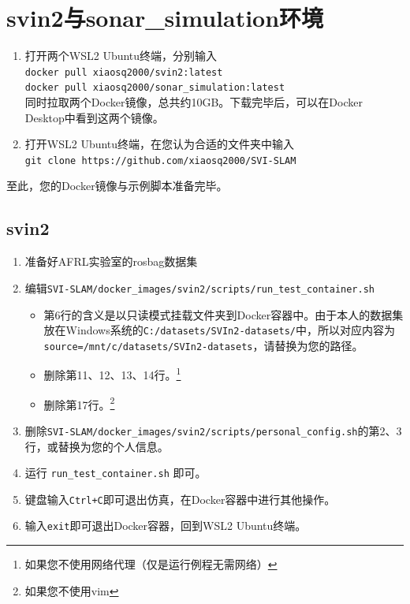 \documentclass[UTF8,zhmap=true,fontset=none,zihao=-4,heading=false,scheme=chinese]{ctexart}
\begin{document}
\section{svin2与sonar\_simulation环境}
\begin{enumerate}
    \item 打开两个WSL2 Ubuntu终端，分别输入 \\
    \verb|docker pull xiaosq2000/svin2:latest| \\ 
    \verb|docker pull xiaosq2000/sonar_simulation:latest| \\ 
    同时拉取两个Docker镜像，总共约10GB。下载完毕后，可以在Docker Desktop中看到这两个镜像。
    \item 打开WSL2 Ubuntu终端，在您认为合适的文件夹中输入 \\
    \verb|git clone https://github.com/xiaosq2000/SVI-SLAM| \\ 
\end{enumerate}
\par 至此，您的Docker镜像与示例脚本准备完毕。
\subsection{svin2}
\begin{enumerate}
    \item 准备好AFRL实验室的rosbag数据集
    \item 编辑\verb|SVI-SLAM/docker_images/svin2/scripts/run_test_container.sh|
    \begin{itemize}
        \item 第6行的含义是以只读模式挂载文件夹到Docker容器中。由于本人的数据集放在Windows系统的\verb|C:/datasets/SVIn2-datasets/|中，所以对应内容为\verb|source=/mnt/c/datasets/SVIn2-datasets|，请替换为您的路径。
        \item 删除第11、12、13、14行。\footnote{如果您不使用网络代理（仅是运行例程无需网络）}
        \item 删除第17行。\footnote{如果您不使用vim}
    \end{itemize}
    \item 删除\verb|SVI-SLAM/docker_images/svin2/scripts/personal_config.sh|的第2、3行，或替换为您的个人信息。
    \item 运行 \verb|run_test_container.sh| 即可。
    \item 键盘输入\verb|Ctrl+C|即可退出仿真，在Docker容器中进行其他操作。
    \item 输入\verb|exit|即可退出Docker容器，回到WSL2 Ubuntu终端。
\end{enumerate}
\end{document}

